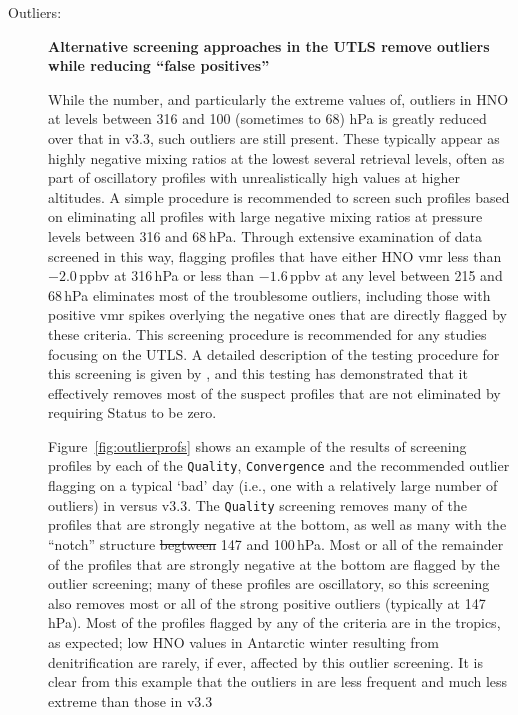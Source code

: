 \documentclass[11pt,draft]{report}
\newcommand{\screeningrule}[1]{\textbf{#1}\par}
\providecommand{\DIFaddtex}[1]{{\protect\color{blue}\uwave{#1}}} %
\providecommand{\DIFdeltex}[1]{{\protect\color{red}\sout{#1}}}                      %
\providecommand{\DIFaddbegin}{} %
\providecommand{\DIFaddend}{} %
\providecommand{\DIFdelbegin}{} %
\providecommand{\DIFdelend}{} %
\providecommand{\DIFadd}[1]{\texorpdfstring{\DIFaddtex{#1}}{#1}} %
\providecommand{\DIFdel}[1]{\texorpdfstring{\DIFdeltex{#1}}{}} %
\begin{document}
\begin{description}
\item[Outliers:] \screeningrule{Alternative screening approaches in the
    UTLS remove outliers while reducing ``false positives''} \DIFdelbegin %

\DIFdelend While the
  number, and particularly the extreme values of, outliers in \thisv
  HNO at levels between 316 and 100 (sometimes to 68) hPa is greatly
  reduced over that in v3.3, such outliers are still present.  These
  typically appear as highly negative mixing ratios at the lowest
  several retrieval levels, often as part of oscillatory profiles with
  unrealistically high values at higher altitudes.  A simple procedure
  is recommended to screen such profiles based on eliminating all
  profiles with large negative mixing ratios at pressure levels between
  316 and 68\,hPa.  Through extensive examination of data screened in
  this way, flagging profiles that have either HNO vmr less than
  $-2.0$\,ppbv at 316\,hPa or less than $-1.6$\,ppbv at any level
  between 215 and 68\,hPa eliminates most of the troublesome outliers,
  including those with positive vmr spikes overlying the negative ones
  that are directly flagged by these criteria.  This screening procedure
  is recommended for any studies focusing on the UTLS\@. A detailed
  description of the testing procedure for this screening is given by
  \citet{EOSMLSV33V34Quality}, and this testing has demonstrated that it
  effectively removes most of the suspect profiles that are not
  eliminated by requiring Status to be zero.

  Figure~\ref{fig:outlierprofs} shows an example of the results of
  screening profiles by each of the \texttt{Quality},
  \texttt{Conver\-gence} and the recommended outlier flagging on a
  typical `bad' day (i.e., one with a relatively large number of
  outliers) in \thisv versus v3.3.  The \texttt{Quality} screening
  removes many of the profiles that are strongly negative at the bottom,
  as well as many \DIFaddbegin \DIFadd{(but not all) }\DIFaddend with the ``notch'' structure \DIFdelbegin \DIFdel{begtween }\DIFdelend \DIFaddbegin \DIFadd{between }\DIFaddend 147
  and 100\,hPa.  Most or all of the remainder of the profiles that are
  strongly negative at the bottom are flagged by the outlier screening;
  many of these profiles are oscillatory, so this screening also removes
  most or all of the strong positive outliers (typically at 147\,hPa).
  Most of the profiles flagged by any of the criteria are in the
  tropics, as expected; low HNO values in Antarctic winter resulting
  from denitrification are rarely, if ever, affected by this outlier
  screening. It is clear from this example that the outliers in \thisv
  are less frequent and much less extreme than those in v3.3

\end{description}
\end{document}
